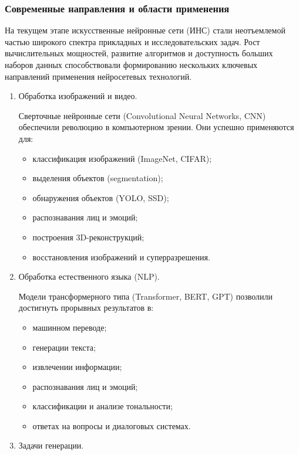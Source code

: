 \subsubsection{Современные направления и области применения}

На текущем этапе искусственные нейронные сети (ИНС) стали неотъемлемой частью широкого спектра прикладных и исследовательских задач. Рост вычислительных мощностей, развитие алгоритмов и доступность больших наборов данных способствовали формированию нескольких ключевых направлений применения нейросетевых технологий.

\begin{enumerate}
	\item Обработка изображений и видео.
	
	Сверточные нейронные сети (Convolutional Neural Networks, CNN) обеспечили революцию в компьютерном зрении. Они успешно применяются для:
	
	\begin{itemize}
		\item классификация изображений (ImageNet, CIFAR);
		\item выделения объектов (segmentation);
		\item обнаружения объектов (YOLO, SSD);
		\item распознавания лиц и эмоций;
		\item построения 3D-реконструкций;
		\item восстановления изображений и суперразрешения.
	\end{itemize}
	
	\item Обработка естественного языка (NLP).
	
	Модели трансформерного типа (Transformer, BERT, GPT) позволили достигнуть прорывных результатов в:
	
	\begin{itemize}
		\item машинном переводе;
		\item генерации текста;
		\item извлечении информации;
		\item распознавания лиц и эмоций;
		\item классификации и анализе тональности;
		\item ответах на вопросы и диалоговых системах.
	\end{itemize}
	
	\item Задачи генерации.
	

\end{enumerate}
